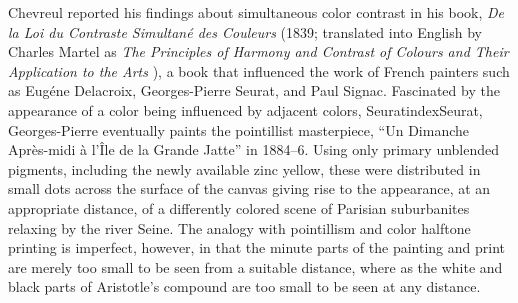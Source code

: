 Chevreul reported his findings about simultaneous color contrast in his book, \emph{De la Loi du Contraste Simultan\'{e} des Couleurs} (1839; translated into English by Charles Martel as \emph{The Principles of Harmony and Contrast of Colours and Their Application to the Arts} \citeyear{Chevreul:1855kx}), a book that influenced the work of French painters such as Eug\'{e}ne Delacroix, Georges-Pierre Seurat, and Paul Signac. Fascinated by the appearance of a color being influenced by adjacent colors, Seuratindex{Seurat, Georges-Pierre} eventually paints the pointillist masterpiece, “Un Dimanche Apr\`{e}s-midi \`{a} l'\^{I}le de la Grande Jatte” in 1884--6. Using only primary unblended pigments, including the newly available zinc yellow, these were distributed in small dots across the surface of the canvas giving rise to the appearance, at an appropriate distance, of a differently colored scene of Parisian suburbanites relaxing by the river Seine. The analogy with pointillism and color halftone printing is imperfect, however, in that the minute parts of the painting and print are merely too small to be seen from a suitable distance, where as the white and black parts of Aristotle's compound are too small to be seen at any distance.



